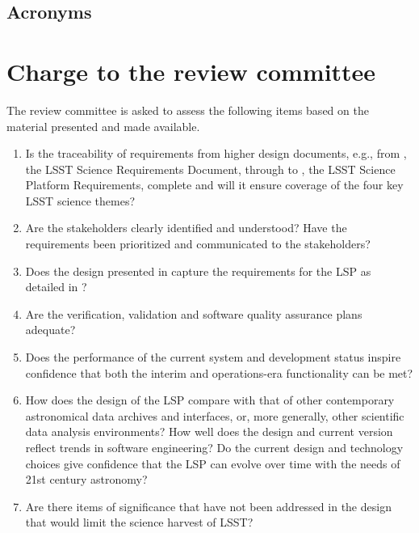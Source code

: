 \documentclass[DM,lsstdraft,STS,toc]{lsstdoc}
\begin{document}
\subsection{Acronyms \label{sect:acronyms}} %



\newpage
\section{Charge to the review committee} 
\label{sec:charge}
The review committee is asked to assess the following items based on the material presented and made available. 
%
\begin{enumerate}

\item Is the traceability of requirements from higher design documents, e.g., from , the LSST Science Requirements Document,
through to , the LSST Science Platform Requirements, complete and will it ensure coverage of the four key LSST science themes?
%
\item Are the stakeholders clearly identified and understood? Have the requirements been prioritized and communicated to the stakeholders?
%
\item Does the design presented in  capture the requirements for the LSP as detailed in ?
%
\item Are the verification, validation and software quality assurance plans adequate? 
%
\item Does the performance of the current system and development status inspire confidence that both the interim and operations-era functionality can be met?  
%
\item How does the design of the LSP compare with that of other contemporary astronomical data archives and interfaces, or, more generally, other scientific data analysis environments? 
How well does the design and current version reflect trends in software engineering? Do the current design and technology choices give confidence that the LSP can 
evolve over time with the needs of 21st century astronomy?
%
\item Are there items of significance that have not been addressed in the design that would limit the science harvest of LSST?

\end{enumerate}
\end{document}
